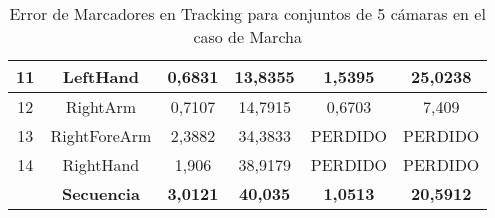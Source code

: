 \begin{table}[ht!]
{\begin{tabular}{c|c|c|c|c|c|}
\multicolumn{1}{|c|}{11} & LeftHand & 0,6831 & 13,8355 & 1,5395 & 25,0238 \\ \hline
\multicolumn{1}{|c|}{12} & RightArm & 0,7107 & 14,7915 & 0,6703 & 7,409 \\ \hline
\multicolumn{1}{|c|}{13} & RightForeArm & 2,3882 & 34,3833 & PERDIDO & PERDIDO \\ \hline
\multicolumn{1}{|c|}{14} & RightHand & 1,906 & 38,9179 & PERDIDO & PERDIDO \\ \hline
 & \textbf{Secuencia} & \textbf{3,0121} & \textbf{40,035} & \textbf{1,0513} & \textbf{20,5912} \\ \cline{2-6} 
\end{tabular}
}
\caption{Error de Marcadores en Tracking para conjuntos de 5 cámaras en el caso de Marcha}
\label{error_captura_marcha_5_camaras}
\end{table}

